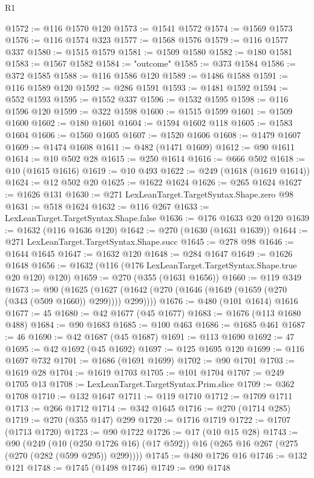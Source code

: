 \begin{lexlean}{R1}
\begin{coremodule}
@1572 := @116 @1570 @120
@1573 := @1541 @1572
@1574 := @1569 @1573
@1576 := @116 @1574 @323
@1577 := @1568 @1576
@1579 := @116 @1577 @337
@1580 := @1515 @1579
@1581 := @1509 @1580
@1582 := @180 @1581
@1583 := @1567 @1582
@1584 := "outcome"
@1585 := @373 @1584
@1586 := @372 @1585
@1588 := @116 @1586 @120
@1589 := @1486 @1588
@1591 := @116 @1589 @120
@1592 := @286 @1591
@1593 := @1481 @1592
@1594 := @552 @1593
@1595 := @1552 @337
@1596 := @1532 @1595
@1598 := @116 @1596 @120
@1599 := @322 @1598
@1600 := @1515 @1599
@1601 := @1509 @1600
@1602 := @180 @1601
@1604 := @1594 @1602 @118
@1605 := @1583 @1604
@1606 := @1560 @1605
@1607 := @1520 @1606
@1608 := @1479 @1607
@1609 := @1474 @1608
@1611 := @482 (@1471 @1609)
@1612 := @90 @1611
@1614 := @10 @502 @28
@1615 := @250 @1614
@1616 := @666 @502
@1618 := @10 (@1615 @1616)
@1619 := @10 @493
@1622 := @249 (@1618 (@1619 @1614))
@1624 := @12 @502 @20
@1625 := @1622 @1624
@1626 := @265 @1624
@1627 := @1626 @131
@1630 := @271 LexLeanTarget.TargetSyntax.Shape.zero @98
@1631 := @518 @1624
@1632 := @116 @267
@1633 := LexLeanTarget.TargetSyntax.Shape.false
@1636 := @176 @1633 @20 @120
@1639 := @1632 (@116 @1636 @120)
@1642 := @270 (@1630 (@1631 @1639))
@1644 := @271 LexLeanTarget.TargetSyntax.Shape.succ
@1645 := @278 @98
@1646 := @1644 @1645
@1647 := @1632 @120
@1648 := @284 @1647
@1649 := @1626 @1648
@1656 := @1632 (@116 (@176 LexLeanTarget.TargetSyntax.Shape.true @20 @120) @120)
@1659 := @270 (@355 (@1631 @1656))
@1660 := @119 @349
@1673 := @90
    (@1625 (@1627 (@1642 (@270 (@1646 (@1649 (@1659 (@270 (@343 (@509 @1660)) @299)))) @299))))
@1676 := @480 (@101 @1614) @1616
@1677 := 45
@1680 := @42 @1677 (@45 @1677)
@1683 := @1676 (@113 @1680 @488)
@1684 := @90 @1683
@1685 := @100 @463
@1686 := @1685 @461
@1687 := 46
@1690 := @42 @1687 (@45 @1687)
@1691 := @113 @1690
@1692 := 47
@1695 := @42 @1692 (@45 @1692)
@1697 := @125 @1695 @120
@1699 := @116 @1697 @732
@1701 := @1686 (@1691 @1699)
@1702 := @90 @1701
@1703 := @1619 @28
@1704 := @1619 @1703
@1705 := @101 @1704
@1707 := @249 @1705 @13
@1708 := LexLeanTarget.TargetSyntax.Prim.slice
@1709 := @362 @1708
@1710 := @132 @1647
@1711 := @119 @1710
@1712 := @1709 @1711
@1713 := @266 @1712
@1714 := @342 @1645
@1716 := @270 (@1714 @285)
@1719 := @270 (@355 @147) @299
@1720 := @1716 @1719
@1722 := @1707 (@1713 @1720)
@1723 := @90 @1722
@1726 := @17 (@10 @15 @28)
@1743 := @90
    (@249
      (@10 (@250 @1726 @16) (@17 @592))
      @16
      (@265 @16 @267 (@275 (@270 (@282 (@599 @295)) @299))))
@1745 := @480 @1726 @16
@1746 := @132 @121
@1748 := @1745 (@1498 @1746)
@1749 := @90 @1748

\end{coremodule}
\end{lexlean}
